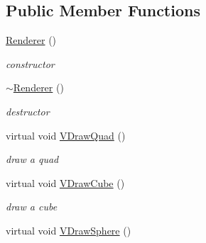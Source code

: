 \subsection*{Public Member Functions}
\begin{DoxyCompactItemize}
\item 
\hypertarget{classPlatform_1_1Renderer_1_1Renderer_a94e489ff9e6db21f5270429285c65a2f}{
\hyperlink{classPlatform_1_1Renderer_1_1Renderer_a94e489ff9e6db21f5270429285c65a2f}{Renderer} ()}
\label{classPlatform_1_1Renderer_1_1Renderer_a94e489ff9e6db21f5270429285c65a2f}

\begin{DoxyCompactList}\small\item\em constructor \item\end{DoxyCompactList}\item 
\hypertarget{classPlatform_1_1Renderer_1_1Renderer_af1c9b6878d761304fa777ef6887fde64}{
\hyperlink{classPlatform_1_1Renderer_1_1Renderer_af1c9b6878d761304fa777ef6887fde64}{$\sim$Renderer} ()}
\label{classPlatform_1_1Renderer_1_1Renderer_af1c9b6878d761304fa777ef6887fde64}

\begin{DoxyCompactList}\small\item\em destructor \item\end{DoxyCompactList}\item 
\hypertarget{classPlatform_1_1Renderer_1_1Renderer_aa2ac8ecaeee1e66ca08cc0f78f65936d}{
virtual void \hyperlink{classPlatform_1_1Renderer_1_1Renderer_aa2ac8ecaeee1e66ca08cc0f78f65936d}{VDrawQuad} ()}
\label{classPlatform_1_1Renderer_1_1Renderer_aa2ac8ecaeee1e66ca08cc0f78f65936d}

\begin{DoxyCompactList}\small\item\em draw a quad \item\end{DoxyCompactList}\item 
\hypertarget{classPlatform_1_1Renderer_1_1Renderer_a175d5c3e4aa509ddb5163a52d7b7199f}{
virtual void \hyperlink{classPlatform_1_1Renderer_1_1Renderer_a175d5c3e4aa509ddb5163a52d7b7199f}{VDrawCube} ()}
\label{classPlatform_1_1Renderer_1_1Renderer_a175d5c3e4aa509ddb5163a52d7b7199f}

\begin{DoxyCompactList}\small\item\em draw a cube \item\end{DoxyCompactList}\item 
\hypertarget{classPlatform_1_1Renderer_1_1Renderer_a9452e7e432c477456614e02b1f001fd5}{
virtual void \hyperlink{classPlatform_1_1Renderer_1_1Renderer_a9452e7e432c477456614e02b1f001fd5}{VDrawSphere} ()}
\label{classPlatform_1_1Renderer_1_1Renderer_a9452e7e432c477456614e02b1f001fd5}


\end{DoxyCompactItemize}
